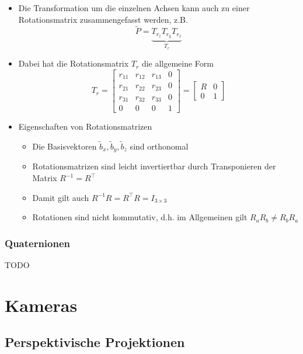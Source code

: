 \documentclass{scrartcl}
\begin{document}
\begin{itemize}
	\item Die Transformation um die einzelnen Achsen kann auch zu einer Rotationsmatrix zusammengefasst werden, z.B.
	\begin{equation}
		\widetilde{P} = \underbrace{T_{r_z} T_{r_y} T_{r_x}}_{T_r}
	\end{equation}
	\item Dabei hat die Rotationsmatrix $T_r$ die allgemeine Form
	\begin{equation}
		T_r = \begin{bmatrix}
	r_{11} & r_{12} & r_{13} & 0 \\
	r_{21} & r_{22} & r_{23} & 0 \\
	r_{31} & r_{32} & r_{33} & 0 \\
	0 & 0 & 0 & 1
	\end{bmatrix} = \begin{bmatrix}
	R & 0 \\
	0 & 1
	\end{bmatrix}
	\end{equation}
	\item Eigenschaften von Rotationsmatrizen
	\begin{itemize}
		\item Die Basisvektoren $\widetilde{b}_x, \widetilde{b}_y, \widetilde{b}_z$ sind orthonomal
		\item Rotationsmatrizen sind leicht invertiertbar durch Transponieren der Matrix $R^{-1} = R^\top$
		\item Damit gilt auch $R^{-1}R = R^\top R = I_{3 \times 3}$
		\item Rotationen sind nicht kommutativ, d.h. im Allgemeinen gilt $R_a R_b \neq R_b R_a$
	\end{itemize}
\end{itemize}

\subsubsection{Quaternionen}

TODO

\section{Kameras}

\subsection{Perspektivische Projektionen}
\end{document}
